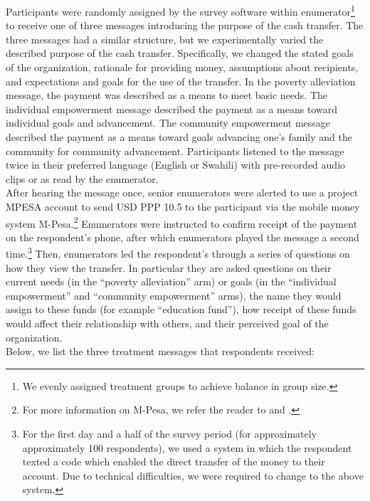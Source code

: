 \documentclass[11pt, a4paper]{article}\usepackage[]{graphicx}\usepackage[]{color}
\begin{document}
        Participants were randomly assigned by the survey software within enumerator\footnote{We evenly assigned treatment groups to achieve balance in group size.} to receive one of three messages introducing the purpose of the cash transfer. The three messages had a similar structure, but we experimentally varied the described purpose of the cash transfer. Specifically, we changed the stated goals of the organization, rationale for providing money, assumptions about recipients, and expectations and goals for the use of the transfer. In the poverty alleviation message, the payment was described as a means to meet basic needs. The individual empowerment message described the payment as a means toward individual goals and advancement. The community empowerment message described the payment as a means toward goals advancing one's family and the community for community advancement. Participants listened to the message twice in their preferred language (English or Swahili) with pre-recorded audio clips or as read by the enumerator. \\

        After hearing the message once, senior enumerators were alerted to use a project MPESA account to send USD PPP 10.5 to the participant via the mobile money system M-Pesa.\footnote{For more information on M-Pesa, we refer the reader to \textcite{jack_mobile_2011} and \textcite{mbiti_mobile_2011}.} Enumerators were instructed to confirm receipt of the payment on the respondent's phone, after which enumerators played the message a second time.\footnote{For the first day and a half of the survey period (for approximately approximately 100 respondents), we used a system in which the respondent texted a code which enabled the direct transfer of the money to their account. Due to technical difficulties, we were required to change to the above system.} Then, enumerators led the respondent's through a series of questions on how they view the transfer. In particular they are asked questions on their current needs (in the ``poverty alleviation'' arm) or goals (in the ``individual empowerment'' and ``community empowerment'' arms), the name they would assign to these funds (for example ``education fund''), how receipt of these funds would affect their relationship with others, and their perceived goal of the organization. \\

        Below, we list the three treatment messages that respondents received: \\
\end{document}
